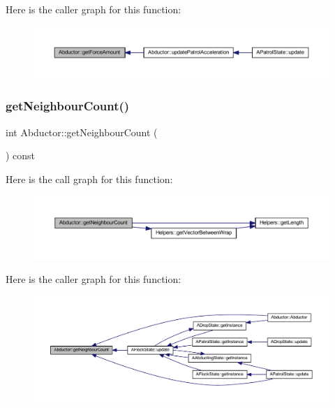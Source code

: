 Here is the caller graph for this function\+:
\nopagebreak
\begin{figure}[H]
\begin{center}
\leavevmode
\includegraphics[width=350pt]{class_abductor_a8bc04ea46a52e8a58feceee69a8965d0_icgraph}
\end{center}
\end{figure}
\mbox{\label{class_abductor_ae8c4cc87315ccc822d59d73a7c12c94a}} 
\subsubsection{\texorpdfstring{get\+Neighbour\+Count()}{getNeighbourCount()}}
{\footnotesize\ttfamily int Abductor\+::get\+Neighbour\+Count (\begin{DoxyParamCaption}{ }\end{DoxyParamCaption}) const}

Here is the call graph for this function\+:
\nopagebreak
\begin{figure}[H]
\begin{center}
\leavevmode
\includegraphics[width=350pt]{class_abductor_ae8c4cc87315ccc822d59d73a7c12c94a_cgraph}
\end{center}
\end{figure}
Here is the caller graph for this function\+:
\nopagebreak
\begin{figure}[H]
\begin{center}
\leavevmode
\includegraphics[width=350pt]{class_abductor_ae8c4cc87315ccc822d59d73a7c12c94a_icgraph}
\end{center}
\end{figure}
\mbox{\label{class_abductor_a10bb137ba1b1707466f0a893052a0b30}} 
